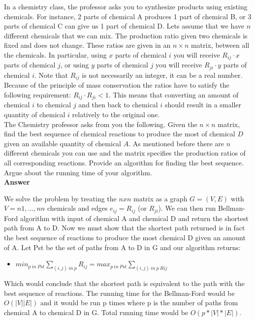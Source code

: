 \documentclass{article}
\begin{document}
\vspace{0.1in}

 In a chemistry class, the
professor asks you to synthesize products using existing
chemicals. For instance, 2 parts of chemical A produces 1 part of
chemical B, or 3 parts of chemical C can give us 1 part of chemical
D. Lets assume that we have $n$ different chemicals that we can
mix. The production ratio given two chemicals is fixed and does not
change. These ratios are given in an $n \times n$ matrix, between all
the chemicals. In particular, using $x$ parts of chemical $i$ you will
receive $R_{ij} \cdot x$ parts of chemical $j$, or using $y$ parts of
chemical $j$ you will receive $R_{ji} \cdot y$ parts of chemical
$i$. Note that $R_{ij}$ is not necessarily an integer, it can be a
real number.\\

\noindent Because of the principle of mass conservation the ratios
have to satisfy the following requirement: $R_{ij} \cdot R_{ji} <
1$. This means that converting an amount of chemical $i$ to chemical
$j$ and then back to chemical $i$ should result in a smaller quantity
of chemical $i$ relatively to the original one.\\

 The Chemistry professor asks from you the
following. Given the $n \times n$ matrix, find the best sequence of
chemical reactions to produce the most of chemical $D$ given an
available quantity of chemical $A$. As mentioned before there are $n$
different chemicals you can use and the matrix specifies the
production ratios of all corresponding reactions. Provide an algorithm
for finding the best sequence. Argue about the running time of your
algorithm.\\

\textbf{ Answer }
\vspace{0.1in}
\begin{adjustwidth}{1.8em}{0pt}
We solve the problem by treating the $n x n$ matrix as a graph $G = (V,E)$ with $V = {n1,...,nn}$ chemicals and edges $e_{ij} = R_{ij}$ (or $R_{ji}$). We can then run Bellman-Ford algorithm with input of chemical A and chemical D and return the shortest path from A to D. Now we must show that the shortest path returned is in fact the best sequence of reactions to produce the most chemical D given an amount of A. Let Pst  be the set of paths from A to D in G and our algorithm returns:
\begin{itemize}
\item $min_{p~in~Pst} \sum_{(i,j)~in~p}  R_{ij} = max_{p~in~Pst}  \sum_{(i,j)~in~p~Rij}$
\end{itemize}
Which would conclude that the shortest path is equivalent to the path with the best sequence of reactions. The running time for the Bellman-Ford would be $O(|V||E|)$ and it would be run p times where p is the number of paths from chemical A to chemical D in G. Total running time would be $O(p*|V|*|E|)$.
\end{adjustwidth}
\end{document}
